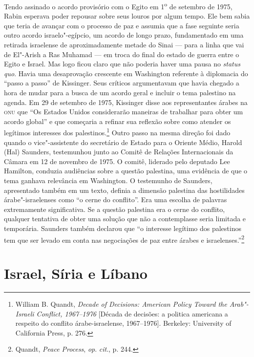 Tendo assinado o acordo provisório com o Egito em 1\textsuperscript{o}
de setembro de 1975, Rabin esperava poder repousar sobre seus louros por
algum tempo. Ele bem sabia que teria de avançar com o processo de paz
e assumia que a fase seguinte seria outro acordo israelo"-egípcio, um
acordo de longo prazo, fundamentado em uma retirada israelense de
aproximadamente metade do Sinai --- para a linha que vai de El"-Arish a
Ras Muhamad --- em troca do final do estado de guerra entre o Egito e
Israel. Mas logo ficou claro que não poderia haver uma pausa no
\textit{status quo}. Havia uma desaprovação crescente em Washington referente à
diplomacia do ``passo a passo'' de Kissinger. Seus críticos argumentavam
que havia chegado a hora de mudar para a busca de um acordo geral e
incluir o tema palestino na agenda. Em 29 de setembro de 1975, Kissinger
disse aos representantes árabes na \textsc{onu} que ``Os Estados Unidos
considerarão maneiras de trabalhar para obter um acordo global'' e que
começaria a refinar sua reflexão sobre como atender os legítimos
interesses dos palestinos.\footnote{William B. Quandt, \textit{Decade of Decisions: American Policy Toward the
Arab"-Israeli Conflict, 1967--1976} {[}Década de decisões: a politica americana a respeito do conflito árabe-israelense, 1967--1976{]}. Berkeley: University of California
Press, p. 276.} Outro passo na mesma direção foi
dado quando o vice"-assistente do secretário de Estado para o Oriente
Médio, Harold (Hal) Saunders, testemunhou junto ao Comitê de Relações
Internacionais da Câmara em 12 de novembro de 1975. O comitê, liderado
pelo deputado Lee Hamilton, conduzia audiências sobre a questão
palestina, uma evidência de que o tema ganhava relevância em Washington.
O testemunho de Saunders, apresentado também em um texto, definia a
dimensão palestina das hostilidades árabe"-israelenses como ``o cerne do
conflito''. Era uma escolha de palavras extremamente significativa. Se a
questão palestina era o cerne do conflito, qualquer tentativa de obter
uma solução que não a contemplasse seria limitada e temporária. Saunders
também declarou que ``o interesse legítimo dos palestinos tem que ser
levado em conta nas negociações de paz entre árabes e
israelenses.''\footnote{Quandt, \textit{Peace Process}, \textit{op}. \textit{cit}., p. 244.}

\section{Israel, Síria e Líbano}

